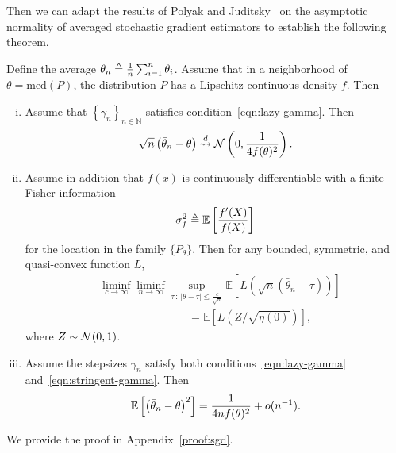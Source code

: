 Then we can adapt the results of Polyak and Juditsky~\cite{PolyakJu92}
on the asymptotic normality of averaged stochastic gradient estimators
to establish the following theorem.
\begin{thm}
  \label{thm:sgd}
  Define the average $\bar{\theta}_n \triangleq \frac{1}{n}
  \sum_{i = 1}^n \theta_i$. Assume
  that in a neighborhood
  of $\theta = \mbox{med}(P)$,
  the distribution $P$ has a Lipschitz continuous density $f$.
  Then
  \begin{enumerate}[(i)]
  \item \label{item:normal-sgd}
    Assume that $\left\{ \gamma_n \right\}_{n\in \mathbb N}$ satisfies
    condition~\eqref{eqn:lazy-gamma}.
    Then
    \begin{equation*}
      \sqrt{n}\left( \bar{\theta}_n - \theta\right)
      \stackrel{d}{\rightsquigarrow} \mathcal{N}\left(0,\frac{1}{4 f(\theta)^2}\right).
    \end{equation*}
  \item \label{item:sgd-regular}
    Assume in addition that $f(x)$ is continuously differentiable with a
    finite Fisher information
    \begin{equation*}
      \sigma_f^2 \triangleq \mathbb{E}\left[ \frac{f'(X)}{f(X)} \right] 
    \end{equation*}
    for the location in the family $\{P_\theta\}$.
    Then for any bounded, symmetric, and quasi-convex function $L$, 
    \begin{align} 
      & \liminf_{c \to \infty} \liminf_{n \to \infty} \sup_{\tau\,:\,|\theta-\tau| \leq \frac{c}{\sqrt{n} }}  \mathbb E \left[ L\left( \sqrt{n}(\bar{\theta}_{n} - \tau) \right) \right] \nonumber 
      \\
      & \qquad \qquad \qquad \qquad = \mathbb E \left[ L (Z/\sqrt{\eta(0)}) \right], \label{eq:attaining_LAM}
    \end{align}
    where $Z \sim \mathcal{N}(0,1)$. 
  \item Assume the stepsizes $\gamma_n$ satisfy both
    conditions~\eqref{eqn:lazy-gamma} and~\eqref{eqn:stringent-gamma}.
    Then
    \begin{equation*}
      \mathbb{E}\left[ \left( \bar{\theta}_n - \theta \right)^2\right] = \frac{1}{4 n f(\theta)^2} + o(n^{-1}). 
    \end{equation*}
  \end{enumerate}
\end{thm}

\noindent
We provide the proof in Appendix~\ref{proof:sgd}.

